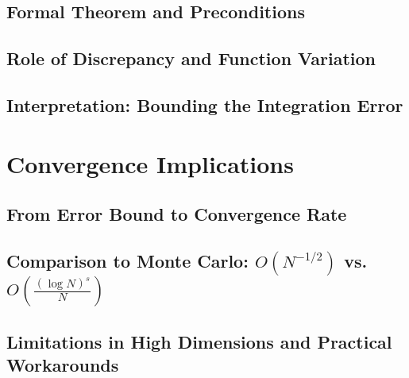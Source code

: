   \subsection{Formal Theorem and Preconditions}



  \subsection{Role of Discrepancy and Function Variation}



  \subsection{Interpretation: Bounding the Integration Error}



\section{Convergence Implications}



  \subsection{From Error Bound to Convergence Rate}



  \subsection{Comparison to Monte Carlo: $O(N^{-1/2})$ vs. $O\left(\frac{(\log N)^s}{N}\right)$}



  \subsection{Limitations in High Dimensions and Practical Workarounds}
